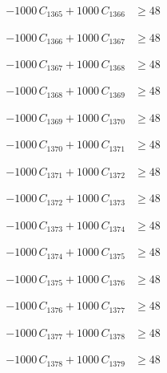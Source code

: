 \documentclass[a4paper,11pt]{article}
\begin{document}
\begin{align}
-1000\,C_{1365} + 1000\,C_{1366} &\geq 48 \nonumber
\end{align}

\begin{align}
-1000\,C_{1366} + 1000\,C_{1367} &\geq 48 \nonumber
\end{align}

\begin{align}
-1000\,C_{1367} + 1000\,C_{1368} &\geq 48 \nonumber
\end{align}

\begin{align}
-1000\,C_{1368} + 1000\,C_{1369} &\geq 48 \nonumber
\end{align}

\begin{align}
-1000\,C_{1369} + 1000\,C_{1370} &\geq 48 \nonumber
\end{align}

\begin{align}
-1000\,C_{1370} + 1000\,C_{1371} &\geq 48 \nonumber
\end{align}

\begin{align}
-1000\,C_{1371} + 1000\,C_{1372} &\geq 48 \nonumber
\end{align}

\begin{align}
-1000\,C_{1372} + 1000\,C_{1373} &\geq 48 \nonumber
\end{align}

\begin{align}
-1000\,C_{1373} + 1000\,C_{1374} &\geq 48 \nonumber
\end{align}

\begin{align}
-1000\,C_{1374} + 1000\,C_{1375} &\geq 48 \nonumber
\end{align}

\begin{align}
-1000\,C_{1375} + 1000\,C_{1376} &\geq 48 \nonumber
\end{align}

\begin{align}
-1000\,C_{1376} + 1000\,C_{1377} &\geq 48 \nonumber
\end{align}

\begin{align}
-1000\,C_{1377} + 1000\,C_{1378} &\geq 48 \nonumber
\end{align}

\begin{align}
-1000\,C_{1378} + 1000\,C_{1379} &\geq 48 \nonumber
\end{align}
\end{document}
